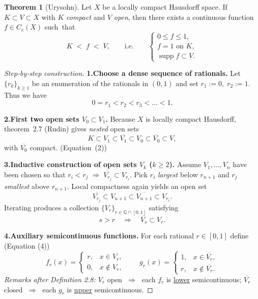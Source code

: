 \documentclass[12pt]{article}
\theoremstyle{definition} %
\newtheorem{theorem}{Theorem}
\theoremstyle{plain} %
\begin{document}
\begin{theorem}[Urysohn]\label{thm:urysohn}
  Let $X$ be a locally compact Hausdorff space.
  If $K\subset V\subset X$ with $K$ \emph{compact} and $V$ \emph{open},
  then there exists a continuous function $f\in C_c(X)$ such~that
  \[
            K\;<\;f\;<\;V,
  \qquad\text{i.e.}\qquad
        \begin{cases}
            0\le f\le1,\\[2pt]
            f=1 \text{ on }K,\\[2pt]
            \operatorname{supp} f \subset V.
        \end{cases}
  \]
  \end{theorem}
  
  \begin{proof}[Step‐by‐step construction]
  
  \textbf{1.\;Choose a dense sequence of rationals.}
  Let $\{r_k\}_{k\ge1}$ be an enumeration of the rationals in $(0,1)$ and set
  $r_1:=0,\; r_2:=1$.
  Thus we have
  \[
     0=r_1<r_2<r_3<\dots<1.
  \]
  
  \medskip
  \textbf{2.\;First two open sets $V_0\subset V_1$.}
  Because $X$ is locally compact Hausdorff,
  theorem~2.7 (Rudin) gives \emph{nested} open sets
  \[
       K\subset V_1\subset \overline{V_1}\subset V_0\subset\overline{V_0}\subset V,
  \]
  with $\overline{V_0}$ compact.   \hfill(Equation~(2))
  
  \medskip
  \textbf{3.\;Inductive construction of open sets $V_k$ ($k\ge2$).}
  Assume $V_1,\dots,V_n$ have been chosen so that
  $r_i<r_j\;\Rightarrow\;\overline{V_{r_j}}\subset V_{r_i}$.
  Pick $r_i$ \emph{largest} below $r_{n+1}$ and $r_j$ \emph{smallest} above $r_{n+1}$.
  Local compactness again yields an open set
  \[
      \overline{V_{r_j}}\subset V_{n+1}\subset\overline{V_{n+1}}\subset V_{r_i}.
  \]
  Iterating produces a collection $\{V_r\}_{r\in\mathbb{Q}\cap[0,1]}$
  satisfying
  \[
     s>r\quad\Longrightarrow\quad \overline{V_s}\subset V_r.
     \tag{3}
  \]
  
  \medskip
  \textbf{4.\;Auxiliary semicontinuous functions.}
  For each rational $r\in[0,1]$ define \hfill(Equation (4))
  \[
     f_r(x)=
     \begin{cases}
         r,& x\in V_r,\\
         0,& x\notin V_r,
     \end{cases}
     \qquad
     g_r(x)=
     \begin{cases}
         1,& x\in\overline{V_r},\\
         r,& x\notin \overline{V_r}.
     \end{cases}
  \]
  \emph{Remarks after Definition 2.8:}
  $V_r$ open $\;\Rightarrow\;$ each $f_r$ is \underline{lower} semicontinuous;
  $\overline{V_r}$ closed $\;\Rightarrow\;$ each $g_r$ is \underline{upper}
  semicontinuous.
  

\end{proof}
\end{document}
